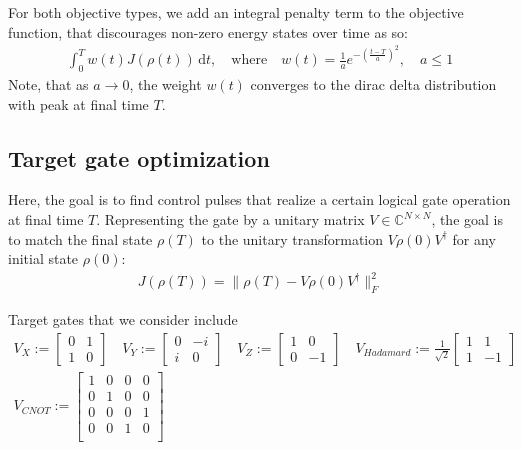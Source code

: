 \documentclass[letterpaper]{article}
\newcommand{\C}{\mathds{C}}
\begin{document}
For both objective types, we add an integral penalty term to the objective function, that discourages non-zero energy states over time as so:
\begin{align}
  \int_0^T w(t) J(\rho(t)) \, \mathrm{d}t, \quad \text{where} \quad w(t) = \frac{1}{a} e^{ -\left(\frac{t-T}{a} \right)^2}, \quad a \leq 1
\end{align}
Note, that as $a\to 0$, the weight $w(t)$ converges to the dirac delta distribution with peak at final time $T$. 

\subsection{Target gate optimization}

Here, the goal is to find control pulses that realize a certain logical gate operation at final time $T$. Representing the gate by a unitary matrix $V\in \C^{N\times N}$, the goal is to match the final state $\rho(T)$ to the unitary transformation $V\rho(0)V^{\dagger}$ for any initial state $\rho(0)$:
\begin{align}
  J(\rho(T)) = \| \rho(T) - V\rho(0)V^{\dagger} \|^2_F 
\end{align} 


Target gates that we consider include
    \begin{align}
      V_{X} := \begin{bmatrix} 0 & 1 \\ 1 & 0  \end{bmatrix} \quad
      V_{Y} := \begin{bmatrix} 0 & -i \\ i & 0 \end{bmatrix} \quad
      V_{Z} := \begin{bmatrix} 1 & 0 \\ 0 & -1 \end{bmatrix} \quad 
      V_{Hadamard} := \frac{1}{\sqrt{2}} \begin{bmatrix} 1 & 1 \\ 1 & -1 \end{bmatrix} \\
      V_{CNOT} := \begin{bmatrix} 1  & 0 & 0 & 0 \\ 
                                   0  & 1 & 0 & 0 \\ 
                                   0  & 0 & 0 & 1 \\ 
                                   0  & 0 & 1 & 0 \\ 
                    \end{bmatrix}
    \end{align}
\end{document}
